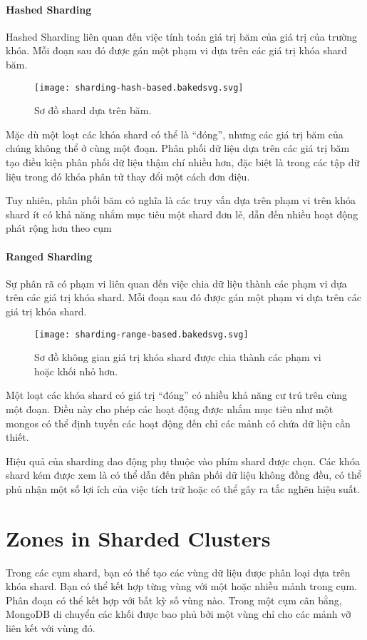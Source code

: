 \paragraph{Hashed Sharding}
Hashed Sharding liên quan đến việc tính toán giá trị băm của giá trị của trường khóa. Mỗi đoạn sau đó được gán một phạm vi dựa trên các giá trị khóa shard băm.

\begin{figure}[h!]
\centering
\captionsetup{justification=centering,margin=1cm}
  	\texttt{[image: sharding-hash-based.bakedsvg.svg]}
  \caption{Sơ đồ shard dựa trên băm.}
  \end{figure}

Mặc dù một loạt các khóa shard có thể là “đóng”, nhưng các giá trị băm của chúng không thể ở cùng một đoạn. Phân phối dữ liệu dựa trên các giá trị băm tạo điều kiện phân phối dữ liệu thậm chí nhiều hơn, đặc biệt là trong các tập dữ liệu trong đó khóa phân tử thay đổi một cách đơn điệu.

Tuy nhiên, phân phối băm có nghĩa là các truy vấn dựa trên phạm vi trên khóa shard ít có khả năng nhắm mục tiêu một shard đơn lẻ, dẫn đến nhiều hoạt động phát rộng hơn theo cụm

\paragraph{Ranged Sharding}
Sự phân rã có phạm vi liên quan đến việc chia dữ liệu thành các phạm vi dựa trên các giá trị khóa shard. Mỗi đoạn sau đó được gán một phạm vi dựa trên các giá trị khóa shard.

\begin{figure}[h!]
\centering
\captionsetup{justification=centering,margin=1cm}
  	\texttt{[image: sharding-range-based.bakedsvg.svg]}
  \caption{Sơ đồ không gian giá trị khóa shard được chia thành các phạm vi hoặc khối nhỏ hơn.}
  \end{figure}

Một loạt các khóa shard có giá trị “đóng” có nhiều khả năng cư trú trên cùng một đoạn. Điều này cho phép các hoạt động được nhắm mục tiêu như một mongos có thể định tuyến các hoạt động đến chỉ các mảnh có chứa dữ liệu cần thiết.

Hiệu quả của sharding dao động phụ thuộc vào phím shard được chọn. Các khóa shard kém được xem là có thể dẫn đến phân phối dữ liệu không đồng đều, có thể phủ nhận một số lợi ích của việc tích trữ hoặc có thể gây ra tắc nghẽn hiệu suất.

\section{Zones in Sharded Clusters}
Trong các cụm shard, bạn có thể tạo các vùng dữ liệu được phân loại dựa trên khóa shard. Bạn có thể kết hợp từng vùng với một hoặc nhiều mảnh trong cụm. Phân đoạn có thể kết hợp với bất kỳ số vùng nào. Trong một cụm cân bằng, MongoDB di chuyển các khối được bao phủ bởi một vùng chỉ cho các mảnh vỡ liên kết với vùng đó.


